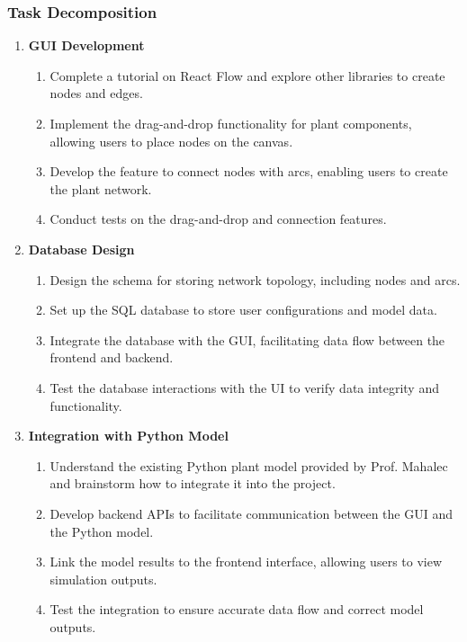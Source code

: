 \documentclass{article}
\begin{document}
\subsubsection{Task Decomposition}
\begin{enumerate}
    \item \textbf{GUI Development}
    \begin{enumerate}[label=\alph*)]
        \item Complete a tutorial on React Flow and explore other libraries to create nodes and edges.
        \item Implement the drag-and-drop functionality for plant components, allowing users to place nodes on the canvas.
        \item Develop the feature to connect nodes with arcs, enabling users to create the plant network.
        \item Conduct tests on the drag-and-drop and connection features.
    \end{enumerate}

    \item \textbf{Database Design}
    \begin{enumerate}[label=\alph*)]
        \item Design the schema for storing network topology, including nodes and arcs.
        \item Set up the SQL database to store user configurations and model data.
        \item Integrate the database with the GUI, facilitating data flow between the frontend and backend.
        \item Test the database interactions with the UI to verify data integrity and functionality.
    \end{enumerate}

    \item \textbf{Integration with Python Model}
    \begin{enumerate}[label=\alph*)]
        \item Understand the existing Python plant model provided by Prof. Mahalec and brainstorm how to integrate it into the project.
        \item Develop backend APIs to facilitate communication between the GUI and the Python model.
        \item Link the model results to the frontend interface, allowing users to view simulation outputs.
        \item Test the integration to ensure accurate data flow and correct model outputs.
    \end{enumerate}


\end{enumerate}
\end{document}
